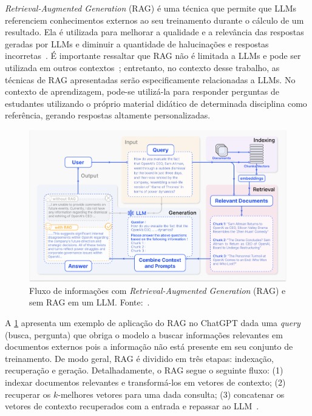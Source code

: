 \documentclass[journal]{IEEEtran}
\begin{document}
\noindent%
\textit{Retrieval-Augmented Generation} (RAG) é uma técnica que permite que LLMs referenciem conhecimentos externos ao seu treinamento durante o cálculo de um resultado.
Ela é utilizada para melhorar a qualidade e a relevância das respostas geradas por LLMs e diminuir a quantidade de halucinações e respostas incorretas~\cite{lewis2020retrieval}.
É importante ressaltar que RAG não é limitada a LLMs e pode ser utilizada em outros contextos~\cite{lewis2020retrieval}; entretanto, no contexto desse trabalho, as técnicas de RAG apresentadas serão especificamente relacionadas a LLMs.
No contexto de aprendizagem, pode-se utilizá-la para responder perguntas de estudantes utilizando o próprio material didático de determinada disciplina como referência, gerando respostas altamente personalizadas.

\begin{figure}[ht!]
    \centering
    \includegraphics[width=\textwidth]{media/RAG_case.png}
    \caption{%
    Fluxo de informações com \textit{Retrieval-Augmented Generation} (RAG) e sem RAG em um LLM\@.
    Fonte:~\cite{gao2023retrieval}.\label{fig:rag_case}}
\end{figure}

A \cref{fig:rag_case} apresenta um exemplo de aplicação do RAG no ChatGPT dada uma \textit{query} (busca, pergunta) que obriga o modelo a buscar informações relevantes em documentos externos pois a informação não está presente em seu conjunto de treinamento.
De modo geral, RAG é dividido em três etapas: indexação, recuperação e geração.
Detalhadamente, o RAG segue o seguinte fluxo: (1) indexar documentos relevantes e transformá-los em vetores de contexto; (2) recuperar os $k$-melhores vetores para uma dada consulta; (3) concatenar os vetores de contexto recuperados com a entrada e repassar ao LLM~\cite{gao2023retrieval}.
\end{document}
